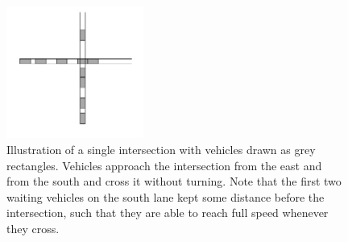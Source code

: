 \documentclass[a4paper]{article}
\theoremstyle{definition}
\theoremstyle{plain}
\begin{document}
\begin{figure}
  \centering
  \includegraphics[width=0.4\textwidth]{figures/single_intersection_example.png}
  \caption{Illustration of a single intersection with vehicles drawn as grey
    rectangles. Vehicles approach the intersection from the east and from the
    south and cross it without turning. Note that the first two waiting vehicles
    on the south lane kept some distance before the intersection, such that they
    are able to reach full speed whenever they
    cross.}\label{fig:intersection_illustration}
\end{figure}
\end{document}
